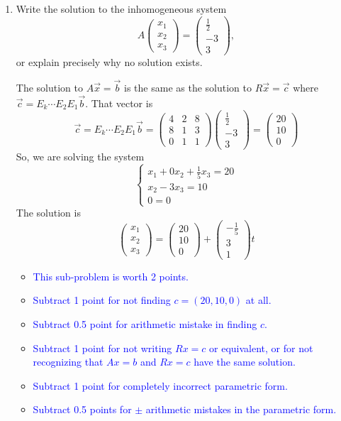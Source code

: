 \documentclass[10pt,twoside]{article}
\begin{document}
\begin{enumerate}
\item 
{\color{red}Write the solution to the inhomogeneous system 
\[ A \begin{pmatrix}
x_1 \\ x_2 \\ x_3
\end{pmatrix} = \begin{pmatrix}\frac12 \\ -3 \\ 3\end{pmatrix},\]
or explain precisely why no solution exists.
}

The solution to $A\vec{x}=\vec{b}$ is the same as the solution to $R \vec{x} =
\vec{c}$ where $\vec{c} = 
E_k\cdots E_2E_1 \vec{b}$.  That vector is
\[ 
\vec{c} = E_k \cdots E_2 E_1\vec{b} 
=
 \begin{pmatrix}
4 & 2 & 8\\
8 & 1 & 3\\
0 & 1 & 1
\end{pmatrix}
\begin{pmatrix}\frac12 \\ -3 \\ 3\end{pmatrix}
= 
\begin{pmatrix}
20 \\ 10 \\ 0
\end{pmatrix}\]
So, we are solving the system
\[
\begin{cases}
x_1 + 0x_2 + \frac15 x_3 = 20\\
x_2 -3x_3 = 10\\
0 = 0
\end{cases}\]
The solution is 
\[ 
\begin{pmatrix}
x_1\\x_2\\x_3
\end{pmatrix}
= 
\begin{pmatrix}20\\10\\0\end{pmatrix}+
\begin{pmatrix}
- \frac15 \\ 3 \\ 1\end{pmatrix}t
\]

\begin{itemize}
\item\textcolor{blue}{This sub-problem is worth 2 points.}
\item\textcolor{blue}{Subtract 1 point for not finding $c = (20,10,0)$ at
all.}
\item\textcolor{blue}{Subtract 0.5 point for arithmetic mistake in finding
$c$.}
\item\textcolor{blue}{Subtract 1 point for not writing $Rx=c$ or equivalent, or
for not recognizing that $Ax=b$ and $Rx=c$ have the same solution.}
\item\textcolor{blue}{Subtract 1 point for completely incorrect parametric
form.}
\item\textcolor{blue}{Subtract 0.5 points for $\pm$ arithmetic mistakes in the
parametric form.}
\end{itemize}



\end{enumerate}
\end{document}
